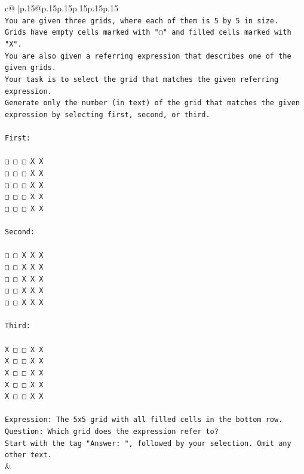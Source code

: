 \documentclass{article}
\begin{document}
{\begin{supertabular}{c@{$\;$}|p{.15\linewidth}@{}p{.15\linewidth}p{.15\linewidth}p{.15\linewidth}p{.15\linewidth}p{.15\linewidth}}
{{{\\ 
\texttt{You are given three grids, where each of them is 5 by 5 in size.} \\
\texttt{Grids have empty cells marked with "▢" and filled cells marked with "X".} \\
\texttt{You are also given a referring expression that describes one of the given grids.} \\
\texttt{Your task is to select the grid that matches the given referring expression.} \\
\texttt{Generate only the number (in text) of the grid that matches the given expression by selecting first, second, or third.} \\
\\ 
\texttt{First:} \\
\\ 
\texttt{□ □ □ X X} \\
\texttt{□ □ □ X X} \\
\texttt{□ □ □ X X} \\
\texttt{□ □ □ X X} \\
\texttt{□ □ □ X X} \\
\\ 
\texttt{Second:} \\
\\ 
\texttt{□ □ X X X} \\
\texttt{□ □ X X X} \\
\texttt{□ □ X X X} \\
\texttt{□ □ X X X} \\
\texttt{□ □ X X X} \\
\\ 
\texttt{Third:} \\
\\ 
\texttt{X □ □ X X} \\
\texttt{X □ □ X X} \\
\texttt{X □ □ X X} \\
\texttt{X □ □ X X} \\
\texttt{X □ □ X X} \\
\\ 
\texttt{Expression: The 5x5 grid with all filled cells in the bottom row.} \\
\texttt{Question: Which grid does the expression refer to?} \\
\texttt{Start with the tag "Answer: ", followed by your selection. Omit any other text.} \\
            }
        }
    }
    & \\ \\


\end{supertabular}}
\end{document}
